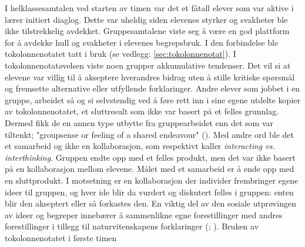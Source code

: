 \documentclass[main.tex]{subfiles}
\begin{document}
I helklassesamtalen ved starten av timen var det et fåtall elever som var aktive i lærer initiert 
diaglog. Dette var uheldig siden elevenes styrker og svakheter ble ikke tilstrekkelig avdekket. 
Gruppesamtalene viste seg å være en god plattform for å avdekke hull og svakheter i elevenes 
begrepsbruk. I den forbindelse ble tokolonnenotatet tatt i bruk (se vedlegg: 
\ref{sec:tokolonnenotat}).
\newline
\newline
I tokolonnenotatøvelsen viste noen grupper akkumulative tendenser. Det vil si at elevene 
var villig til å akseptere hverandres bidrag uten å stille kritiske spørsmål og fremsette
alternative eller utfyllende forklaringer. Andre elever som jobbet i en gruppe, arbeidet så og si
selvstendig ved å føre rett inn i sine egene utdelte kopier av tokolonnenotatet, et sluttresult som 
ikke var basert på et felles grunnlag. Dermed fikk de en annen type utbytte fra gruppearbeidet
enn det som var tiltenkt; "groupsense or feeling of a shared endeavour" (). 
Med andre ord ble det et samarbeid og ikke en kollaborasjon, som  respektivt kaller 
\emph{interacting vs. interthinking}. Gruppen endte opp med et felles produkt, men det var ikke 
basert på en kollaborasjon mellom elevene. Målet med et samarbeid er å ende opp med en sluttprodukt. 
I motsetning er en kollaborasjon der individer frembringer egene ideer til gruppen, og hver ide
blir da vurdert og diskutert felles i gruppen: enten blir den akseptert eller så forkastes den.
\newline
\newline
En viktig del av den sosiale utprøvingen av ideer og begreper innebærer å sammenlikne egne 
forestillinger med andres forestillinger i tillegg til naturvitenskapens forklaringer 
(; ). Bruken av tokolonnenotatet i første timen 
\end{document}
